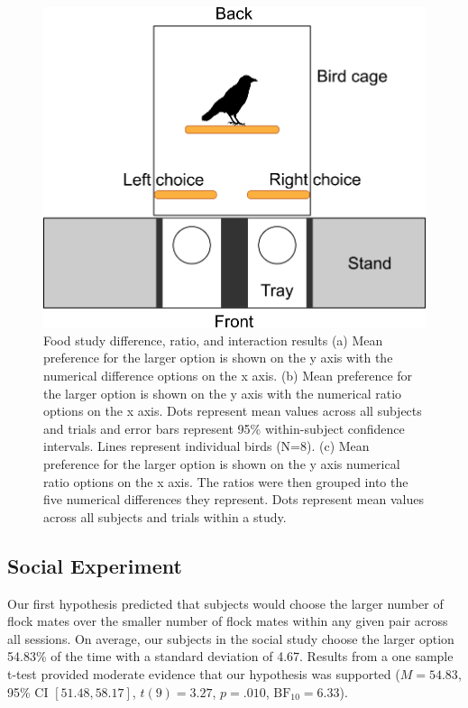 \documentclass[
  ,doc,floatsintext]{apa6}
\begin{document}
\begin{figure}

{\centering \includegraphics[width=1\linewidth]{../figures/food_apparatus} 

}

\caption{Food study difference, ratio, and interaction results (a) Mean preference for the larger option is shown on the y axis with the numerical difference options on the x axis. (b) Mean preference for the larger option is shown on the y axis with the numerical ratio options on the x axis. Dots represent mean values across all subjects and trials and error bars represent 95\% within-subject confidence intervals. Lines represent individual birds (N=8). (c) Mean preference for the larger option is shown on the y axis numerical ratio options on the x axis. The ratios were then grouped into the five numerical differences they represent. Dots represent mean values across all subjects and trials within a study.}\label{fig:foodgraphs}
\end{figure}

\hypertarget{social-experiment-1}{%
\subsection{Social Experiment}\label{social-experiment-1}}

Our first hypothesis predicted that subjects would choose the larger number of flock mates over the smaller number of flock mates within any given pair across all sessions. On average, our subjects in the social study choose the larger option 54.83\% of the time with a standard deviation of 4.67. Results from a one sample t-test provided moderate evidence that our hypothesis was supported (\(M = 54.83\), 95\% CI \([51.48, 58.17]\), \(t(9) = 3.27\), \(p = .010\), \(\mathrm{BF}_{\textrm{10}} = 6.33\)).
\end{document}
